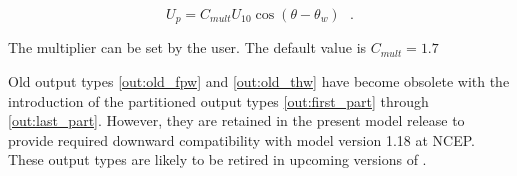 \begin{equation}
U_p = C_{mult} U_{10} \cos ( \theta - \theta_w )  \:\:\: . \label{eq:Up}
\end{equation}

\noindent
The multiplier can be set by the user. The default value is $C_{mult} = 1.7$

Old output types \ref{out:old_fpw} and \ref{out:old_thw} have become obsolete
with the introduction of the partitioned output types \ref{out:first_part}
through \ref{out:last_part}. However, they are retained in the present model
release to provide required downward compatibility with model version 1.18 at
NCEP. These output types are likely to be retired in upcoming versions of \ws.


